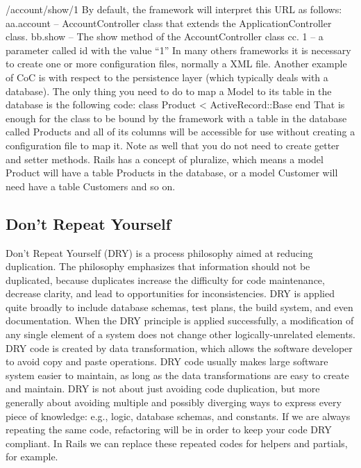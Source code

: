 /account/show/1
By default, the framework will interpret this URL as follows: aa.account – AccountController class that extends the ApplicationController class.
bb.show – The show method of the AccountController class
cc. 1 – a parameter called id with the value “1” In many others frameworks it is necessary to create one or more configuration files,
normally a XML file.
Another example of CoC is with respect to the persistence layer (which typically deals with a database). The only thing you need to do to map a Model to its table in the database is the following code:
class Product < ActiveRecord::Base end
That is enough for the class to be bound by the framework with a table in the database called Products and all of its columns will be accessible for use without creating a configuration file to map it. Note as well that you do not need to create getter and setter methods.
Rails has a concept of pluralize, which means a model Product will have a table Products in the database, or a model Customer will need have a table Customers and so on.


\subsection{Don’t Repeat Yourself} 

Don’t Repeat Yourself (DRY) is a process philosophy aimed at reducing duplication. The philosophy emphasizes that information should not be duplicated, because duplicates increase the difficulty for code maintenance, decrease clarity, and lead to opportunities for inconsistencies.
DRY is applied quite broadly to include database schemas, test plans, the build system, and even documentation. When the DRY principle is applied successfully, a modification of any single element of a system does not change other logically-unrelated elements.
DRY code is created by data transformation, which allows the software developer to avoid copy and paste operations. DRY code usually makes large software system easier to maintain, as long as the data transformations are easy to create and maintain.
DRY is not about just avoiding code duplication, but more generally about avoiding multiple and possibly diverging ways to express every piece of knowledge: e.g., logic, database schemas, and constants.
If we are always repeating the same code, refactoring will be in order to keep your code DRY compliant. In Rails we can replace these repeated codes for helpers and partials, for example.





